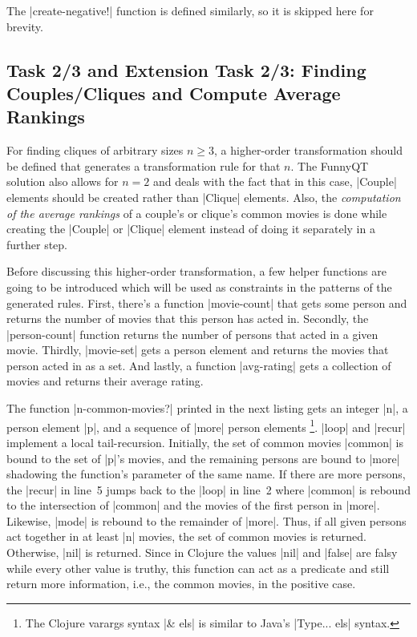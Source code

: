 \documentclass[submission]{eptcs}
\newcommand{\code}{\clojureinline}
\begin{document}
The \code|create-negative!| function is defined similarly, so it is skipped
here for brevity.


\subsection{Task 2/3 and Extension Task 2/3: Finding Couples/Cliques and
  Compute Average Rankings}
\label{sec:task-2:finding-groups}

For finding cliques of arbitrary sizes \(n \geq 3\),
a higher-order transformation should be defined that generates a transformation
rule for that \(n\).
The FunnyQT solution also allows for \(n = 2\)
and deals with the fact that in this case, \code|Couple| elements should be
created rather than \code|Clique| elements.  Also, the \emph{computation of the
  average rankings} of a couple's or clique's common movies is done while
creating the \code|Couple| or \code|Clique| element instead of doing it
separately in a further step.

Before discussing this higher-order transformation, a few helper functions are
going to be introduced which will be used as constraints in the patterns of the
generated rules.  First, there's a function \code|movie-count| that gets some
person and returns the number of movies that this person has acted in.
Secondly, the \code|person-count| function returns the number of persons that
acted in a given movie.  Thirdly, \code|movie-set| gets a person element and
returns the movies that person acted in as a set.  And lastly, a function
\code|avg-rating| gets a collection of movies and returns their average rating.

The function \code|n-common-movies?| printed in the next listing gets an
integer \code|n|, a person element \code|p|, and a sequence of \code|more|
person elements \footnote{The Clojure varargs syntax \code|& els| is similar to
  Java's \code|Type... els| syntax.}.  \code|loop| and \code|recur| implement a
local tail-recursion.  Initially, the set of common movies \code|common| is
bound to the set of \code|p|'s movies, and the remaining persons are bound to
\code|more| shadowing the function's parameter of the same name.  If there are
more persons, the \code|recur| in line~5 jumps back to the \code|loop| in
line~2 where \code|common| is rebound to the intersection of \code|common| and
the movies of the first person in \code|more|.  Likewise, \code|mode| is
rebound to the remainder of \code|more|.  Thus, if all given persons act
together in at least \code|n| movies, the set of common movies is returned.
Otherwise, \code|nil| is returned.  Since in Clojure the values \code|nil| and
\code|false| are falsy while every other value is truthy, this function can act
as a predicate and still return more information, i.e., the common movies, in
the positive case.
\end{document}
